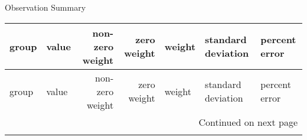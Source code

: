 \documentclass{article}
\begin{document}
\begin{center}
Observation Summary
\end{center}
\begin{center}
\begin{landscape}
\setlength{\LTleft}{-4.0cm}
\begin{longtable}{llrrlll}
\toprule
      group &                    value &  non-zero weight &  zero weight & weight & standard deviation &       percent error \\
\midrule
\endfirsthead

\toprule
      group &                    value &  non-zero weight &  zero weight & weight & standard deviation &       percent error \\
\midrule
\endhead
\midrule
\multicolumn{7}{r}{{Continued on next page}} \\
\midrule
\endfoot


\end{longtable}
\end{landscape}
\end{center}
\end{document}
